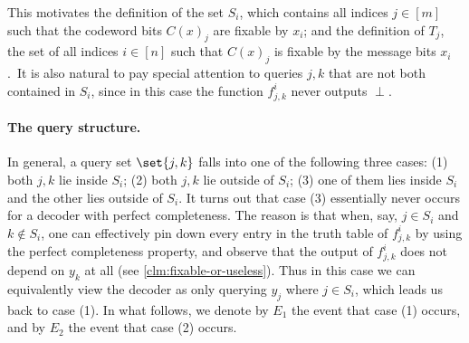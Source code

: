 \documentclass[10pt,a4paper]{article}
\theoremstyle{remark}
\begin{document}
This motivates the definition of the set $S_i$, which contains all indices $j \in [m]$ such that the codeword bits $C(x)_j$ are fixable by $x_i$; and the definition of $T_j$, the set of all indices $i \in [n]$ such that $C(x)_j$ is fixable by the message bits $x_i$.\ It is also natural to pay special attention to queries $j,k$ that are not both contained in $S_i$, since in this case the function $f_{j,k}^{i}$ never outputs $\perp$.

\paragraph{The query structure.} In general, a query set $\set{j,k}$ falls into one of the following three cases: (1) both $j,k$ lie inside $S_i$; (2) both $j,k$ lie outside of $S_i$; (3) one of them lies inside $S_i$ and the other lies outside of $S_i$. It turns out that case (3) essentially never occurs for a decoder with perfect completeness. The reason is that when, say, $j \in S_i$ and $k \notin S_i$, one can effectively pin down every entry in the truth table of $f_{j,k}^{i}$ by using the perfect completeness property, and observe that the output of $f_{j,k}^{i}$ does not depend on $y_k$ at all (see \cref{clm:fixable-or-useless}). Thus in this case we can equivalently view the decoder as only querying $y_j$ where $j \in S_i$, which leads us back to case (1). In what follows, we denote by $E_1$ the event that case (1) occurs, and by $E_2$ the event that case (2) occurs.
\end{document}
